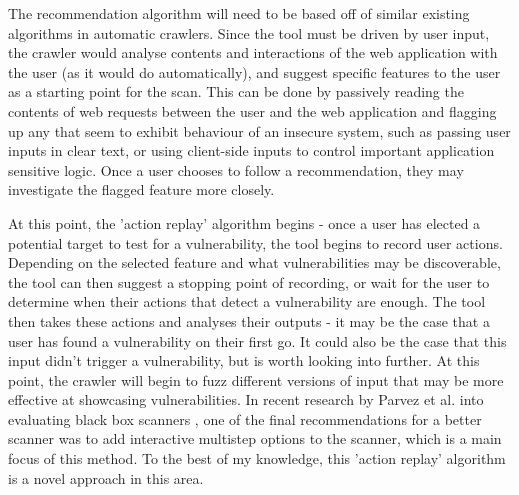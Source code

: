 \begin{itemize}
	The recommendation algorithm will need to be based off of similar existing algorithms in automatic crawlers. Since the tool must be driven by user input, the crawler would analyse contents and interactions of the web application with the user (as it would do automatically), and suggest specific features to the user as a starting point for the scan. This can be done by passively reading the contents of web requests between the user and the web application and flagging up any that seem to exhibit behaviour of an insecure system, such as passing user inputs in clear text, or using client-side inputs to control important application sensitive logic. Once a user chooses to follow a recommendation, they may investigate the flagged feature more closely.
	
	At this point, the 'action replay' algorithm begins - once a user has elected a potential target to test for a vulnerability, the tool begins to record user actions. Depending on the selected feature and what vulnerabilities may be discoverable, the tool can then suggest a stopping point of recording, or wait for the user to determine when their actions that detect a vulnerability are enough. The tool then takes these actions and analyses their outputs - it may be the case that a user has found a vulnerability on their first go. It could also be the case that this input didn't trigger a vulnerability, but is worth looking into further. At this point, the crawler will begin to fuzz different versions of input that may be more effective at showcasing vulnerabilities. In recent research by Parvez et al. into evaluating black box scanners \cite{analysisOfEffectivenessOfBlackBoxWebAppScannersStoredSQLStoredXSS}, one of the final recommendations for a better scanner was to add interactive multistep options to the scanner, which is a main focus of this method. To the best of my knowledge, this 'action replay' algorithm is a novel approach in this area.
	

\end{itemize}
